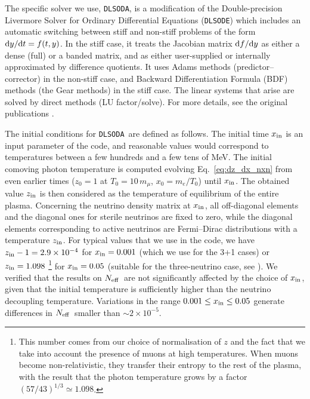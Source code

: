 \documentclass[notitlepage,nofootinbib,showpacs,preprintnumbers,amsmath,amssymb,superscriptaddress,prd,onecolumn]{revtex4-1}
\newcommand{\Neff}{\ensuremath{N_{\rm eff}}}
\newcommand{\e}[1]{\ensuremath{\times10^{#1}}}
\newcommand{\dlsoda}{\texttt{DLSODA}}
\begin{document}
The specific solver we use, \dlsoda,
is a modification of the Double-precision Livermore Solver for Ordinary Differential Equations (\texttt{DLSODE})
which includes an automatic switching between stiff and non-stiff problems
of the form ${\rm d}y/{\rm d}t = f(t,y)$.
In the stiff case, it treats the Jacobian matrix ${\rm d}f/{\rm d}y$ as either a dense (full) or a banded matrix, and as either user-supplied or internally approximated by difference quotients.
It uses Adams methods (predictor--corrector) in the non-stiff case, and Backward Differentiation Formula (BDF) methods (the Gear methods) in the stiff case.
The linear systems that arise are solved by direct methods (LU factor/solve).
For more details, see the original publications  \cite{hindmarsh1982odepack,dlsoda1}.

The initial conditions for \dlsoda\ are defined as follows.
The initial time $x_{\rm in}$ is an input parameter of the code,
and reasonable values would correspond to temperatures between a few hundreds and a few tens of MeV.
The initial comoving photon temperature is computed evolving Eq.~\eqref{eq:dz_dx_nxn}
from even earlier times ($z_0=1$ at $T_0=10\, m_\mu$, $x_0=m_e/T_0$) until $x_{\rm in}$.
The obtained value $z_{\rm in}$ is then considered as the temperature of equilibrium
of the entire plasma. Concerning the neutrino density matrix at $x_{\rm in}$, all off-diagonal elements and the diagonal ones for sterile
neutrinos are fixed to zero, while the diagonal elements corresponding to active neutrinos are 
Fermi--Dirac distributions with a temperature $z_{\rm in}$.
For typical values that we use in the code,
we have $z_{\rm in}-1=2.9\e{-4}$ for $x_{\rm in}=0.001$ (which we use for the 3+1 cases)
or
$z_{\rm in} = 1.098$%
\footnote{
This number comes from our choice of normalisation of $z$ and the fact that
we take into account the presence of muons at high temperatures.
When muons become non-relativistic, they transfer their entropy to the rest of the plasma,
with the result that the photon temperature grows by a factor
$(57/43)^{1/3}\simeq 1.098$.
}
for $x_{\rm in}=0.05$ (suitable for the three-neutrino case, see \cite{deSalas:2016ztq}).
We verified \cite{Bennett:2020zkv} that the results on \Neff\ are not significantly affected by the choice of $x_{\rm in}$,
given that the initial temperature is sufficiently higher than the neutrino decoupling temperature.
Variations in the range $0.001\leq x_{\rm in}\leq 0.05$ generate differences in \Neff\ smaller
than $\sim2\times 10^{-5}$.
\end{document}
